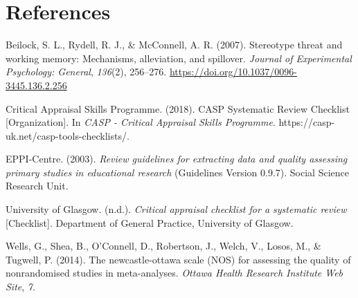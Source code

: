 \documentclass[
  doc, a4paper]{apa7}
\newlength{\cslhangindent}
\newenvironment{CSLReferences}[2] %
 {\begin{list}{}{%
  \setlength{\itemindent}{0pt}
  \setlength{\leftmargin}{0pt}
  \setlength{\parsep}{0pt}
  \ifodd #1
   \setlength{\leftmargin}{\cslhangindent}
   \setlength{\itemindent}{-1\cslhangindent}
  \fi
  \setlength{\itemsep}{#2\baselineskip}}}
 {\end{list}}
\begin{document}
\section{References}\label{references}

\label{refs}
\begin{CSLReferences}{1}{0}
Beilock, S. L., Rydell, R. J., \& McConnell, A. R. (2007). Stereotype threat and working memory: {Mechanisms}, alleviation, and spillover. \emph{Journal of Experimental Psychology: General}, \emph{136}(2), 256--276. \url{https://doi.org/10.1037/0096-3445.136.2.256}

Critical Appraisal Skills Programme. (2018). {CASP Systematic Review Checklist} {[}Organization{]}. In \emph{CASP - Critical Appraisal Skills Programme}. https://casp-uk.net/casp-tools-checklists/.

EPPI-Centre. (2003). \emph{Review guidelines for extracting data and quality assessing primary studies in educational research} (Guidelines Version 0.9.7). Social Science Research Unit.

University of Glasgow. (n.d.). \emph{Critical appraisal checklist for a systematic review} {[}Checklist{]}. Department of General Practice, University of Glasgow.

Wells, G., Shea, B., O'Connell, D., Robertson, J., Welch, V., Losos, M., \& Tugwell, P. (2014). The newcastle-ottawa scale ({NOS}) for assessing the quality of nonrandomised studies in meta-analyses. \emph{Ottawa Health Research Institute Web Site}, \emph{7}.

\end{CSLReferences}
\end{document}
